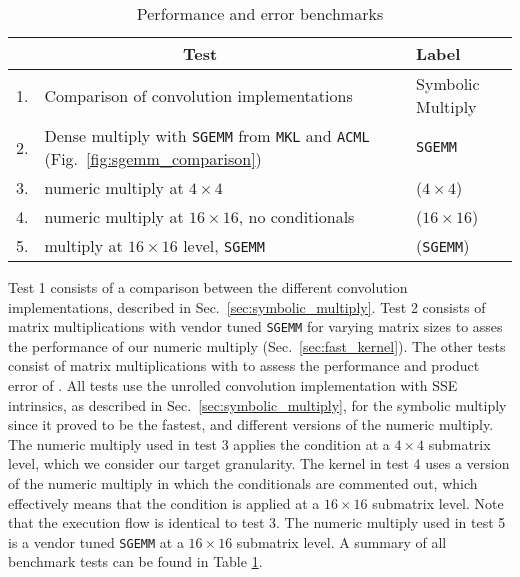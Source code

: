 \begin{table}
\caption{\label{table:benchmarks} Performance and error benchmarks}
\begin{center}
\begin{tabular}{rp{}ll}
\hline
\hline
\multicolumn{2}{c}{Test} & \hspace{0.2cm} & Label \\
\hline
1.
  & Comparison of convolution implementations
  &
  & Symbolic Multiply \\
2.
  & Dense multiply with {\tt SGEMM} from {\tt MKL} and {\tt ACML}
  (Fig.~\ref{fig:sgemm_comparison})
  &
  & {\tt SGEMM} \\
3.
  & \SpAMM{} numeric multiply at $4 \times 4$
  &
  & \SpAMM{}($4 \times 4$) \\
4.
  & \SpAMM{} numeric multiply at $16 \times 16$, no conditionals
  &
  & \SpAMM{}($16 \times 16$) \\
5.
  & \SpAMM{} multiply at $16 \times 16$ level, {\tt SGEMM}
  &
  & \SpAMM{}({\tt SGEMM}) \\
\hline
\hline
\end{tabular}
\end{center}
\end{table}

Test 1 consists of a comparison between the different convolution
implementations, described in Sec.~\ref{sec:symbolic_multiply}.  Test 2
consists of matrix multiplications with vendor tuned {\tt SGEMM} for varying
matrix sizes to asses the performance of our numeric multiply
(Sec.~\ref{sec:fast_kernel}).  The other tests consist of matrix
multiplications with \SpAMM{} to assess the performance and product error of
\SpAMM{}. All \SpAMM{} tests use the unrolled convolution implementation with
SSE intrinsics, as described in Sec.~\ref{sec:symbolic_multiply}, for the
symbolic multiply since it proved to be the fastest, and different versions of
the numeric multiply. The numeric multiply used in test 3 applies the \SpAMM{}
condition at a $4 \times 4$ submatrix level, which we consider our target
granularity. The kernel in test 4 uses a version of the numeric multiply in
which the \SpAMM{} conditionals are commented out, which effectively means
that the \SpAMM{} condition is applied at a $16 \times 16$ submatrix level.
Note that the execution flow is identical to test 3. The numeric multiply used
in test 5 is a vendor tuned {\tt SGEMM} at a $16 \times 16$ submatrix level. A
summary of all benchmark tests can be found in Table \ref{table:benchmarks}.

